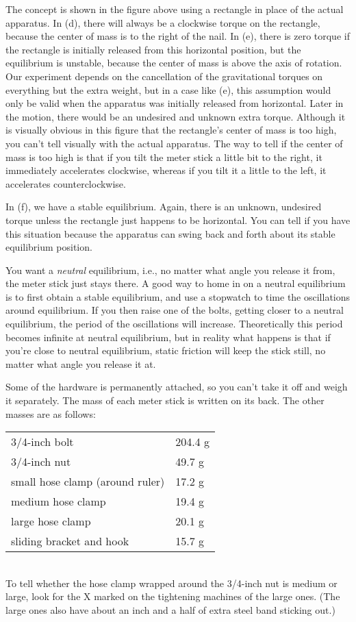 The concept
is shown in the figure above using a rectangle in place of
the actual apparatus.
In (d), there will always be a
clockwise torque on the rectangle, because the center of
mass is to the right of the nail.
In (e), there is zero torque if the rectangle is initially
released from this horizontal position, but the equilibrium
is unstable, because the center of mass is above the axis of
rotation. Our experiment depends on the cancellation of the
gravitational torques on everything but the extra weight,
but in a case like (e), this assumption would only be valid
when the apparatus was initially released from horizontal.
Lat\-er in the motion, there would be an undesired and unknown
extra torque. Although it is visually obvious in this figure
that the rectangle's center of mass is too high, you can't
tell visually with the actual apparatus. The way to tell if
the center of mass is too high is that if you tilt the meter
stick a little bit to the right, it immediately accelerates
clockwise, whereas if you tilt it a little to the left, it
accelerates counterclockwise.

In (f), we have a stable equilibrium. Again, there is an
unknown, undesired torque unless the rectangle just happens
to be horizontal. You can tell if you have this situation
because the apparatus can swing back and forth about its
stable equilibrium position.

You want a \emph{neutral} equilibrium, i.e., no matter what
angle you release it from, the meter stick just stays there.
A good way to home in on a neutral equilibrium is to first obtain
a stable equilibrium, and use a stopwatch to time the oscillations
around equilibrium. If you then raise one of the bolts, getting
closer to a neutral equilibrium, the period of the oscillations
will increase. Theoretically this period becomes infinite at neutral
equilibrium, but in reality what happens is that if you're close
to neutral equilibrium, static friction will keep the stick still,
no matter what angle you release it at.

Some of the hardware is permanently attached, so you can't take it
off and weigh it separately. The mass of each meter stick is written
on its back. The other masses are as follows:\\
\begin{tabular}{ll}
3/4-inch bolt       & 204.4 g \\
3/4-inch nut        &  49.7 g \\
small hose clamp (around ruler) & 17.2 g \\
medium hose clamp & 19.4 g \\
large hose clamp & 20.1 g\\
sliding bracket and hook & 15.7 g \\
\end{tabular}\\
To tell whether the hose clamp wrapped around the 3/4-inch nut
is medium or large, look for the X marked on the tightening machines
of the large ones. (The large ones also have about an inch and a half of
extra steel band sticking out.)

